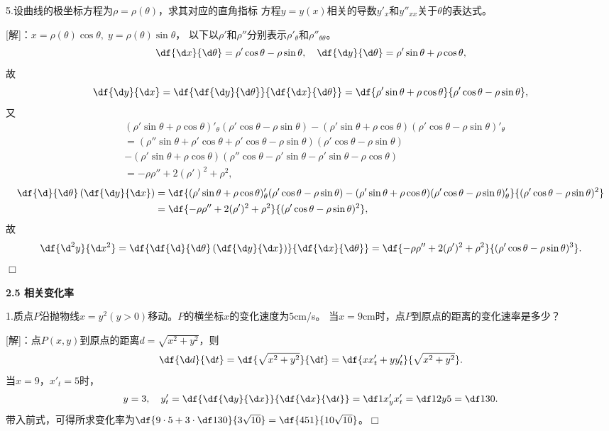 \bigskip

5.设曲线的极坐标方程为$\rho=\rho(\theta)$，求其对应的直角指标
方程$y=y(x)$相关的导数$y'_x$和$y''_{xx}$关于$\theta$的表达式。

[解]：$x=\rho(\theta)\cos\theta,\;y=\rho(\theta)\sin\theta$，
以下以$\rho'$和$\rho''$分别表示$\rho'_{\theta}$和$\rho''_{\theta\theta}$。
$$\df{\d x}{\d\theta}=\rho'\cos\theta-\rho\sin\theta,
\quad
\df{\d y}{\d\theta}=\rho'\sin\theta+\rho\cos\theta,$$
故
$$\df{\d y}{\d x}=\df{\df{\d y}{\d\theta}}{\df{\d x}{\d\theta}}
=\df{\rho'\sin\theta+\rho\cos\theta}{\rho'\cos\theta-\rho\sin\theta},$$
又
\begin{align*}
	&(\rho'\sin\theta+\rho\cos\theta)'_{\theta}(\rho'\cos\theta-\rho\sin\theta)
	-(\rho'\sin\theta+\rho\cos\theta)(\rho'\cos\theta-\rho\sin\theta)'_{\theta}\\
	&=(\rho''\sin\theta+\rho'\cos\theta+\rho'\cos\theta-\rho\sin\theta)
	(\rho'\cos\theta-\rho\sin\theta)\\
	&-(\rho'\sin\theta+\rho\cos\theta)
	(\rho''\cos\theta-\rho'\sin\theta-\rho'\sin\theta-\rho\cos\theta)\\
	&=-\rho\rho''+2(\rho')^2+\rho^2,
\end{align*}
\begin{align*}
	\df{\d}{\d\theta}\left(\df{\d y}{\d x}\right)
	&=\df{(\rho'\sin\theta+\rho\cos\theta)'_{\theta}(\rho'\cos\theta-\rho\sin\theta)
	-(\rho'\sin\theta+\rho\cos\theta)(\rho'\cos\theta-\rho\sin\theta)'_{\theta}}
	{(\rho'\cos\theta-\rho\sin\theta)^2}\\
	&=\df{-\rho\rho''+2(\rho')^2+\rho^2}{(\rho'\cos\theta-\rho\sin\theta)^2},
\end{align*}
故
$$
\df{\d^2y}{\d x^2}
=\df{\df{\d}{\d\theta}\left(\df{\d y}{\d x}\right)}{\df{\d x}{\d\theta}}
=\df{-\rho\rho''+2(\rho')^2+\rho^2}{(\rho'\cos\theta-\rho\sin\theta)^3}.
$$
\hfill$\Box$

\begin{center}
	\bf 2.5 相关变化率
\end{center}

\bigskip

1.质点$P$沿抛物线$x=y^2(y>0)$移动。$P$的横坐标$x$的变化速度为$5$cm/s。
当$x=9$cm时，点$P$到原点的距离的变化速率是多少？

[解]：点$P(x,y)$到原点的距离$d=\sqrt{x^2+y^2}$，则
$$\df{\d d}{\d t}=\df{\sqrt{x^2+y^2}}{\d t}
=\df{xx'_t+yy'_t}{\sqrt{x^2+y^2}}.$$
当$x=9$，$x'_t=5$时，
$$
	y=3,\quad
	y'_t=\df{\df{\d y}{\d x}}{\df{\d x}{\d t}}
	=\df1{x'_yx'_t}=\df1{2y5}=\df1{30}.
$$
带入前式，可得所求变化率为$\df{9\cdot 5+3\cdot\df1{30}}{3\sqrt{10}}
=\df{451}{10\sqrt{10}}$。\hfill$\Box$

